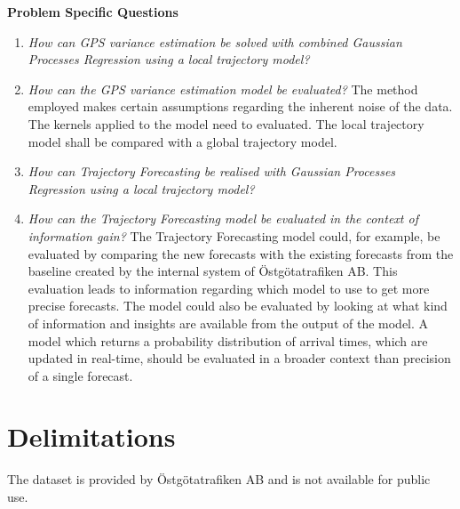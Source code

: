 \begin{description}
  \item \textbf{Problem Specific Questions}
  \begin{enumerate}
    \item \textit{How can GPS variance estimation be solved with combined Gaussian Processes Regression using a local trajectory model?} \newline
    \item \textit{How can the GPS variance estimation model be evaluated?} \newline
    The method employed makes certain assumptions regarding the inherent noise of the data.
    The kernels applied to the model need to evaluated.
    The local trajectory model shall be compared with a global trajectory model.
    \item \textit{How can Trajectory Forecasting be realised with Gaussian Processes Regression using a local trajectory model?} \newline
    \item \textit{How can the Trajectory Forecasting model be evaluated in the context of information gain?} \newline
    The Trajectory Forecasting model could, for example, be evaluated by comparing the new forecasts with the existing forecasts from the baseline created by the internal system of Östgötatrafiken AB.
    This evaluation leads to information regarding which model to use to get more precise forecasts.
    The model could also be evaluated by looking at what kind of information and insights are available from the output of the model.
    A model which returns a probability distribution of arrival times, which are updated in real-time, should be evaluated in a broader context than precision of a single forecast.
  \end{enumerate}
\end{description}

\section{Delimitations}
\label{sec:delimitations}
The dataset is provided by Östgötatrafiken AB and is not available for public use.
